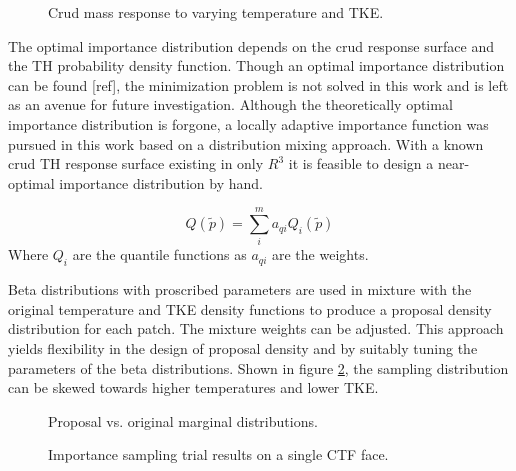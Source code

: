 \begin{figure}[H]%
    \centering
    \qquad
    \caption[]{Crud mass response to varying temperature and TKE.}%
    \label{fig:crud_sensi3}%
\end{figure}


The optimal importance distribution depends on the crud response surface and the TH probability density function.  Though an optimal importance distribution can be found [ref], the minimization problem is not solved in this work and is left as an avenue for future investigation.
Although the theoretically optimal importance distribution is forgone, a locally adaptive importance function was pursued in this work based on a distribution mixing approach.  With a known crud TH response surface existing in only $R^3$ it is feasible to design a near-optimal importance distribution by hand.

\begin{equation}
Q(\tilde{p}) = \sum_i^m a_{qi} Q_i(\tilde{p})
\end{equation}
Where $Q_i$ are the quantile functions as $a_{qi}$ are the weights.

Beta distributions with proscribed parameters are used in mixture with the original temperature and TKE density functions to produce a proposal density distribution for each patch.  The mixture weights can be adjusted.  This approach yields flexibility in the design of proposal density and by suitably tuning the parameters of the beta distributions.  Shown in figure \ref{fig:imp_sample2}, the sampling distribution can be skewed towards higher temperatures and lower TKE.

\begin{figure}[H]%
    \centering
    \qquad
    \caption[]{Proposal vs. original marginal distributions.}%
    \label{fig:imp_sample2}%
\end{figure}


\begin{figure}[H]%
    \centering
    \qquad
    \caption[]{Importance sampling trial results on a single CTF face.}%
    \label{fig:imp_sample1}%
\end{figure}

